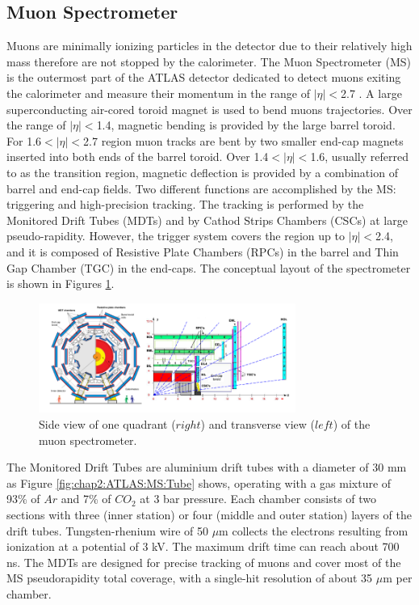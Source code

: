 \subsection{Muon Spectrometer}
\label{chap2:ATLAS:MS}
Muons are minimally ionizing particles in the detector due to their relatively high mass therefore are not stopped by the calorimeter. The Muon Spectrometer (MS) is the outermost part of the ATLAS detector dedicated to detect muons exiting the calorimeter and measure their momentum in the range of $|\eta|<$2.7 \cite{Muon_TDR}. A large superconducting air-cored toroid magnet is used to bend muons trajectories. Over the range of $|\eta|<$1.4, magnetic bending is provided by the large barrel toroid. For 1.6$<|\eta|<$2.7 region muon tracks are bent by two smaller end-cap magnets inserted into both ends of the barrel toroid. Over 1.4$<|\eta|<$1.6, usually referred to as the transition region, magnetic deflection is provided by a combination of barrel and end-cap fields. Two different functions are accomplished by the MS: triggering and high-precision tracking. The tracking is performed by the Monitored Drift Tubes (MDTs) and by Cathod Strips Chambers (CSCs) at large pseudo-rapidity. However, the trigger system covers the region up to $|\eta|<$2.4, and it is composed of Resistive Plate Chambers (RPCs) in the barrel and Thin Gap Chamber (TGC) in the end-caps. The conceptual layout of the spectrometer is shown in Figures \ref{fig:chap2:ATLAS:MS}. \\
\begin{figure}[htbp]
    \centering
    \includegraphics[width=0.75\textwidth]{Ch2/Img/Muon.png}
    \caption{Side view of one quadrant ($right$) and transverse view ($left$) of the muon spectrometer.}
    \label{fig:chap2:ATLAS:MS}
\end{figure}
The Monitored Drift Tubes are aluminium drift tubes with a diameter of 30 mm as Figure \ref{fig:chap2:ATLAS:MS:Tube} shows, operating with a gas mixture of 93\% of $Ar$ and 7\% of $CO_2$ at 3 bar pressure. Each chamber consists of two sections with three (inner station) or four (middle and outer station) layers of the drift tubes. Tungsten-rhenium wire of 50 $\mu$m collects the electrons resulting from ionization at a potential of 3 kV. The maximum drift time can reach about 700 ns. The MDTs are designed for precise tracking of muons and cover most of the MS pseudorapidity total coverage, with a single-hit resolution of about 35 $\mu$m per chamber. \\
